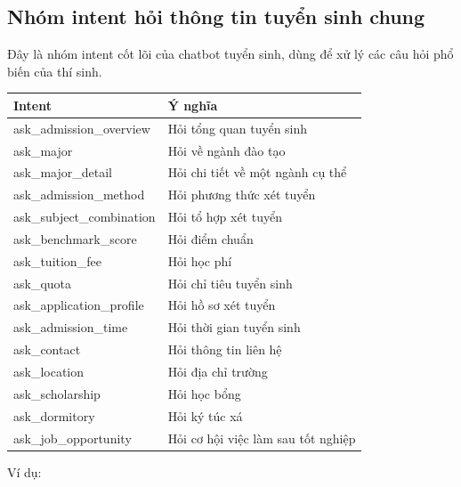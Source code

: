\subsection*{Nhóm intent hỏi thông tin tuyển sinh chung}

Đây là nhóm intent cốt lõi của chatbot tuyển sinh, dùng để xử lý các câu hỏi phổ biến của thí sinh.

\begin{table}[H]
\centering
\begin{tabular}{|l|p{9cm}|}
\hline
\textbf{Intent} & \textbf{Ý nghĩa} \\
\hline
ask\_admission\_overview & Hỏi tổng quan tuyển sinh \\
\hline
ask\_major & Hỏi về ngành đào tạo \\
\hline
ask\_major\_detail & Hỏi chi tiết về một ngành cụ thể \\
\hline
ask\_admission\_method & Hỏi phương thức xét tuyển \\
\hline
ask\_subject\_combination & Hỏi tổ hợp xét tuyển \\
\hline
ask\_benchmark\_score & Hỏi điểm chuẩn \\
\hline
ask\_tuition\_fee & Hỏi học phí \\
\hline
ask\_quota & Hỏi chỉ tiêu tuyển sinh \\
\hline
ask\_application\_profile & Hỏi hồ sơ xét tuyển \\
\hline
ask\_admission\_time & Hỏi thời gian tuyển sinh \\
\hline
ask\_contact & Hỏi thông tin liên hệ \\
\hline
ask\_location & Hỏi địa chỉ trường \\
\hline
ask\_scholarship & Hỏi học bổng \\
\hline
ask\_dormitory & Hỏi ký túc xá \\
\hline
ask\_job\_opportunity & Hỏi cơ hội việc làm sau tốt nghiệp \\
\hline
\end{tabular}
\end{table}

Ví dụ:


